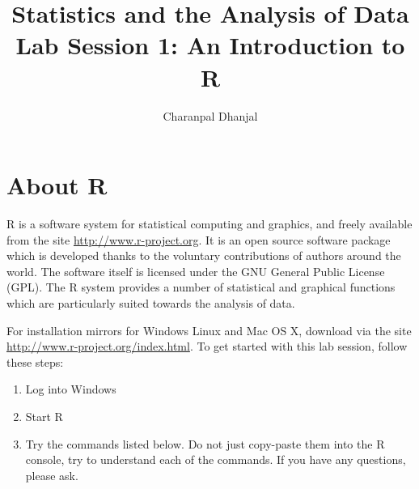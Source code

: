 \documentclass[a4paper,10pt]{article}
\title{Statistics and the Analysis of Data\\ Lab Session 1: An Introduction to R}
\author{Charanpal Dhanjal}
\begin{document}
\maketitle

\section{About R}

R is a software system for statistical computing and graphics, and  freely available from the site \url{http://www.r-project.org}. It is an open source software package which is developed thanks to the voluntary contributions of authors around the world. The software itself is licensed under the GNU General Public License (GPL). The R system provides a number of statistical and graphical functions which are particularly suited towards the analysis of data. 

For installation mirrors for Windows Linux and Mac OS X, download via the site \url{http://www.r-project.org/index.html}. To get started with this lab session, follow these steps: 
\begin{enumerate}
 \item Log into Windows 
 \item Start R 
 \item Try the commands listed below. Do not just copy-paste them into the R console, try to understand each of the commands. If you have any questions, please ask. 
\end{enumerate}
\end{document}
